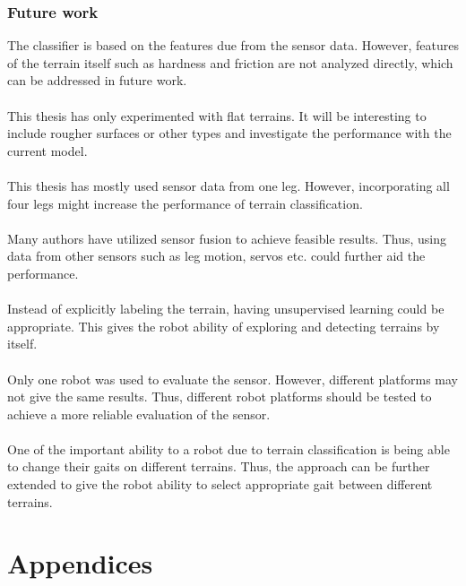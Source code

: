 \documentclass[USenglish]{ifimaster}  %
\begin{document}
\section{Future work}
The classifier is based on the features due from the sensor data. However, features of the terrain itself such as hardness and friction are not analyzed directly, which can be addressed in future work. 
\\
\\
This thesis has only experimented with flat terrains. It will be interesting to include rougher surfaces or other types and investigate the performance with the current model. 
\\
\\
This thesis has mostly used sensor data from one leg. However, incorporating all four legs might increase the performance of terrain classification. 
\\
\\
Many authors have utilized sensor fusion to achieve feasible results. Thus, using data from other sensors such as leg motion, servos etc. could further aid the performance.
\\
\\
Instead of explicitly labeling the terrain, having unsupervised learning could be appropriate. This gives the robot ability of exploring and detecting terrains by itself.
\\
\\
Only one robot was used to evaluate the sensor. However, different platforms may not give the same results. Thus, different robot platforms should be tested to achieve a more reliable evaluation of the sensor.
\\
\\
One of the important ability to a robot due to terrain classification is being able to change their gaits on different terrains. Thus, the approach can be further extended to give the robot ability to select appropriate gait between different terrains.

	


\backmatter{}



\part*{Appendices} 
\appendix
\end{document}
